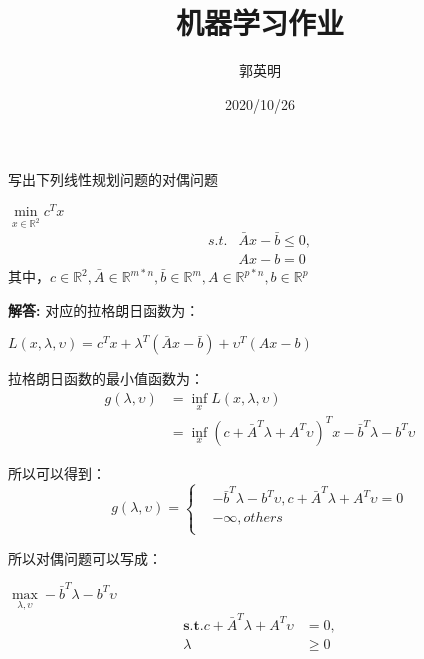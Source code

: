 \documentclass[UTF8]{ctexart}
\title{机器学习作业}
\author{郭英明}
\date{2020/10/26}
\begin{document}
\maketitle
\section{}
写出下列线性规划问题的对偶问题
\begin{center}
$\min \limits_{x\in\mathbb{R}^2} c^{T}x$
\begin{align}
s.t.& \bar{A}x-\bar{b}\leq0,\\
&Ax-b=0
\end{align}
其中，$c\in\mathbb{R}^2,\bar{A}\in\mathbb{R}^{m*n},\bar{b}\in\mathbb{R}^{m},{A}\in\mathbb{R}^{p*n},{b}\in\mathbb{R}^{p}$
\end{center}

\noindent\textbf{解答:}
对应的拉格朗日函数为：
\begin{center}
$L(x,\lambda,\upsilon)=c^{T}x+\lambda^{T}(\bar{A}x-\bar{b})+\upsilon^{T}(Ax-b)$\\
\end{center}
拉格朗日函数的最小值函数为：
\begin{align}
g(\lambda,\upsilon)&=\inf_{x}L(x,\lambda,\upsilon)\\
&=\inf_{x}(c+\bar{A}^{T}\lambda+A^{T}\upsilon)^{T}x-\bar{b}^{T}\lambda-b^{T}\upsilon
\end{align}

所以可以得到：\\
\begin{equation}
g(\lambda,\upsilon)=\left\{
\begin{aligned}
&-\bar{b}^{T}\lambda-b^{T}\upsilon,c+\bar{A}^{T}\lambda+A^{T}\upsilon=0\\
&-\infty,others\\
\end{aligned}
\right.
\end{equation}

所以对偶问题可以写成：
\begin{center}
$\max \limits_{\lambda,\upsilon}-\bar{b}^{T}\lambda-b^{T}\upsilon$
\begin{align}
\boldsymbol{s.t.}  c+\bar{A}^{T}\lambda+A^{T}\upsilon&=0,\\
\lambda&\ge0
\end{align}
\end{center}
\end{document}
